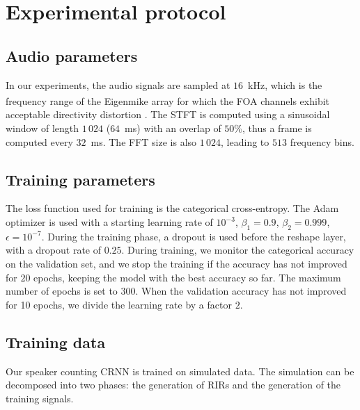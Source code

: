 \section{Experimental protocol}
\subsection{Audio parameters}
\label{ss:countingAudioParameters}

In our experiments, the audio signals are sampled at $16$~kHz, which is the frequency range of the Eigenmike\textsuperscript{\textregistered} array for which the FOA channels exhibit acceptable directivity distortion \cite{baque_analyse_2017}. The STFT is computed using a sinusoidal window of length $1\,024$ ($64$~ms) with an overlap of $50$\%, thus a frame is computed every $32$~ms. The FFT size is also $1\,024$, leading to $513$ frequency bins. 

\subsection{Training parameters}

The loss function used for training is the categorical cross-entropy. The Adam optimizer \cite{kingma_adam:_2014} is used with a starting learning rate of $10^{-3}$, $\beta_1 = 0.9$, $\beta_2=0.999$, $\epsilon = 10^{-7}$. During the training phase, a dropout is used before the reshape layer, with a dropout rate of $0.25$. During training, we monitor the categorical accuracy on the validation set, and we stop the training if the accuracy has not improved for $20$ epochs, keeping the model with the best accuracy so far. The maximum number of epochs is set to $300$. When the validation accuracy has not improved for 10 epochs, we divide the learning rate by a factor $2$.

\subsection{Training data}
\label{ss:countingTrainingData}

Our speaker counting CRNN is trained on simulated data. The simulation can be decomposed into two phases: the generation of RIRs and the generation of the training signals.


